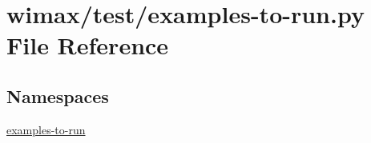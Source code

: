 \hypertarget{wimax_2test_2examples-to-run_8py}{}\section{wimax/test/examples-\/to-\/run.py File Reference}
\label{wimax_2test_2examples-to-run_8py}
\subsection*{Namespaces}
\begin{DoxyCompactItemize}
\item 
 \hyperlink{namespaceexamples-to-run}{examples-\/to-\/run}
\end{DoxyCompactItemize}
